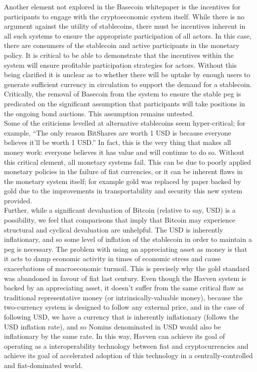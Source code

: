 \noindent Another element not explored in the Basecoin whitepaper is the incentives for participants to engage with the cryptoeconomic system itself. While there is no argument against the utility of stablecoins, there must be incentives inherent in all such systems to ensure the appropriate participation of all actors. In this case, there are consumers of the stablecoin and active participants in the monetary policy. It is critical to be able to demonstrate that the incentives within the system will ensure profitable participation strategies for actors. Without this being clarified it is unclear as to whether there will be uptake by enough users to generate sufficient currency in circulation to support the demand for a stablecoin. Critically, the removal of Basecoin from the system to ensure the stable peg is predicated on the significant assumption that participants will take positions in the ongoing bond auctions. This assumption remains untested. \\

\noindent Some of the criticisms levelled at alternative stablecoins seem hyper-critical; for example, ``The only reason BitShares are worth 1 USD is because everyone believes it’ll be worth 1 USD.'' In fact, this is the very thing that makes all money work: everyone believes it has value and will continue to do so. Without this critical element, all monetary systems fail. This can be due to poorly applied monetary policies in the failure of fiat currencies, or it can be inherent flaws in the monetary system itself; for example gold was replaced by paper backed by gold due to the improvements in transportability and security this new system provided. \\

\noindent Further, while a significant devaluation of Bitcoin (relative to say, USD) is a possibility, we feel that comparisons that imply that Bitcoin may experience structural and cyclical devaluation are unhelpful. The USD is inherently inflationary, and so some level of inflation of the stablecoin in order to maintain a peg is necessary. The problem with using an appreciating asset as money is that it acts to damp economic activity in times of economic stress and cause exacerbations of macroeconomic turmoil. This is precisely why the gold standard was abandoned in favour of fiat last century. Even though the Havven system is backed by an appreciating asset, it doesn't suffer from the same critical flaw as traditional representative money (or intrinsically-valuable money), because the two-currency system is designed to follow any external price, and in the case of following USD, we have a currency that is inherently inflationary (follows the USD inflation rate), and so Nomins denominated in USD would also be inflationary by the same rate. In this way, Havven can achieve its goal of operating as a interoperability technology between fiat and cryptocurrencies and achieve its goal of accelerated adoption of this technology in a centrally-controlled and fiat-dominated world. \\

